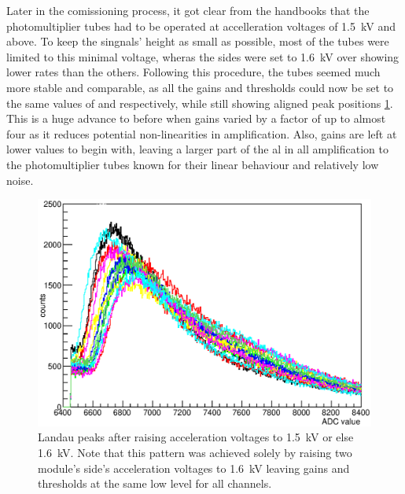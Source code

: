 	Later in the comissioning process, it got clear from the handbooks that the photomultiplier tubes had to be operated at accelleration voltages of \SI{1.5}{\kilo\volt} and above. To keep the singnals' height as small as possible, most of the tubes were limited to this minimal voltage, wheras the sides  were set to \SI{1.6}{\kilo\volt} over showing lower rates than the others. Following this procedure, the tubes seemed much more stable and comparable, as all the gains and thresholds could now be set to the same values of  and respectively, while still showing aligned peak positions \ref{fig:allPeaksAfter}. This is a huge advance to before when gains varied by a factor of up to almost four as it reduces potential non-linearities in amplification. Also, gains are left at lower values to begin with, leaving a larger part of the al in all amplification to the photomultiplier tubes known for their linear behaviour and relatively low noise.
  
	\begin{figure}
		\centering
		\includegraphics[width = 0.9 \textwidth]{graphics/setup/LandauPeaksRun1097_new.eps}
		\caption{Landau peaks after raising acceleration voltages to \SI{1.5}{\kilo\volt} or else \SI{1.6}{\kilo\volt}. Note that this pattern was achieved solely by raising two module's side's acceleration voltages to \SI{1.6}{\kilo\volt} leaving gains and thresholds at the same low level for all channels. }
		\label{fig:allPeaksAfter}
	\end{figure}



